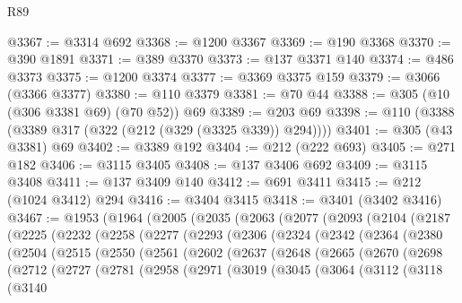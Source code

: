\begin{lexlean}{R89}
\begin{coremodule}
@3367 := @3314 @692
@3368 := @1200 @3367
@3369 := @190 @3368
@3370 := @390 @1891
@3371 := @389 @3370
@3373 := @137 @3371 @140
@3374 := @486 @3373
@3375 := @1200 @3374
@3377 := @3369 @3375 @159
@3379 := @3066 (@3366 @3377)
@3380 := @110 @3379
@3381 := @70 @44
@3388 := @305 (@10 (@306 @3381 @69) (@70 @52)) @69
@3389 := @203 @69
@3398 := @110 (@3388 (@3389 @317 (@322 (@212 (@329 (@3325 @339)) @294))))
@3401 := @305 (@43 @3381) @69
@3402 := @3389 @192
@3404 := @212 (@222 @693)
@3405 := @271 @182
@3406 := @3115 @3405
@3408 := @137 @3406 @692
@3409 := @3115 @3408
@3411 := @137 @3409 @140
@3412 := @691 @3411
@3415 := @212 (@1024 @3412) @294
@3416 := @3404 @3415
@3418 := @3401 (@3402 @3416)
@3467 := @1953
    (@1964
      (@2005
        (@2035
          (@2063
            (@2077
              (@2093
                (@2104
                  (@2187
                    (@2225
                      (@2232
                        (@2258
                          (@2277
                            (@2293
                              (@2306
                                (@2324
                                  (@2342
                                    (@2364
                                      (@2380
                                        (@2504
                                          (@2515
                                            (@2550
                                              (@2561
                                                (@2602
                                                  (@2637
                                                    (@2648
                                                      (@2665
                                                        (@2670
                                                          (@2698
                                                            (@2712
                                                              (@2727
                                                                (@2781
                                                                  (@2958
                                                                    (@2971
                                                                      (@3019
                                                                        (@3045
                                                                          (@3064
                                                                            (@3112
                                                                              (@3118
                                                                                (@3140

\end{coremodule}
\end{lexlean}
